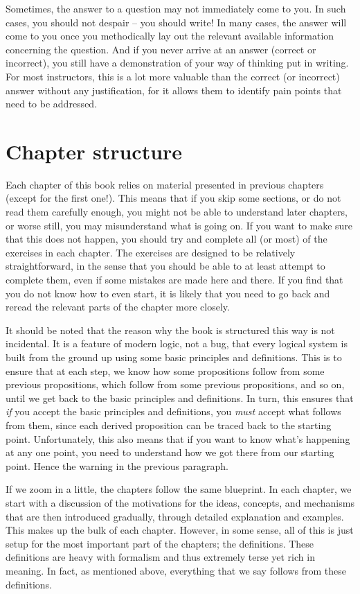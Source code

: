 Sometimes, the answer to a question may not immediately come to you. In such cases, you should not despair -- you should write! In many cases, the answer will come to you once you methodically lay out the relevant available information concerning the question. And if you never arrive at an answer (correct or incorrect), you still have a demonstration of your way of thinking put in writing. For most instructors, this is a lot more valuable than the correct (or incorrect) answer without any justification, for it allows them to identify pain points that need to be addressed. 

\section*{Chapter structure}

Each chapter of this book relies on material presented in previous chapters (except for the first one!). This means that if you skip some sections, or do not read them carefully enough, you might not be able to understand later chapters, or worse still, you may misunderstand what is going on. If you want to make sure that this does not happen, you should try and complete all (or most) of the exercises in each chapter. The exercises are designed to be relatively straightforward, in the sense that you should be able to at least attempt to complete them, even if some mistakes are made here and there. If you find that you do not know how to even start, it is likely that you need to go back and reread the relevant parts of the chapter more closely. 

It should be noted that the reason why the book is structured this way is not incidental. It is a feature of modern logic, not a bug, that every logical system is built from the ground up using some basic principles and definitions. This is to ensure that at each step, we know how some propositions follow from some previous propositions, which follow from some previous propositions, and so on, until we get back to the basic principles and definitions. In turn, this ensures that \textit{if} you accept the basic principles and definitions, you \textit{must} accept what follows from them, since each derived proposition can be traced back to the starting point. Unfortunately, this also means that if you want to know what's happening at any one point, you need to understand how we got there from our starting point. Hence the warning in the previous paragraph. 

If we zoom in a little, the chapters follow the same blueprint. In each chapter, we start with a discussion of the motivations for the ideas, concepts, and mechanisms that are then introduced gradually, through detailed explanation and examples. This makes up the bulk of each chapter. However, in some sense, all of this is just setup for the most important part of the chapters; the definitions. These definitions are heavy with formalism and thus extremely terse yet rich in meaning. In fact, as mentioned above, everything that we say follows from these definitions. 

